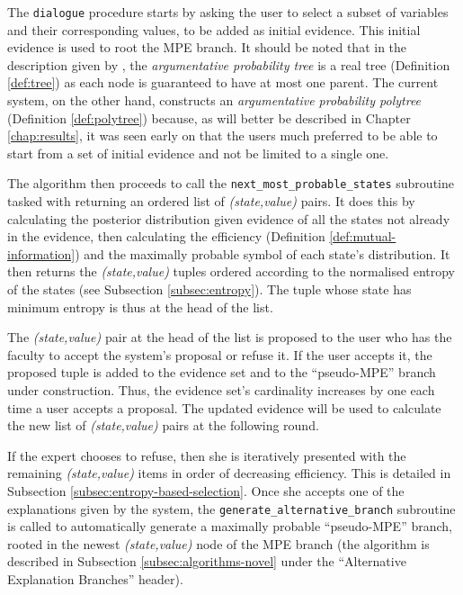 The \texttt{dialogue} procedure starts by asking the user to select a subset of variables and their corresponding values, to be added as initial evidence.
This initial evidence is used to root the MPE branch.
It should be noted that in the description given by \citet{Butz2018}, the \textit{argumentative probability tree} is a real tree (Definition \ref{def:tree}) as each node is guaranteed to have at most one parent.
The current system, on the other hand, constructs an \textit{argumentative probability polytree} (Definition \ref{def:polytree}) because, as will better be described in Chapter \ref{chap:results}, it was seen early on that the users much preferred to be able to start from a set of initial evidence and not be limited to a single one.

The algorithm then proceeds to call the \texttt{next\_most\_probable\_states} subroutine tasked with returning an ordered list of \textit{(state,value)} pairs.
It does this by calculating the posterior distribution given evidence of all the states not already in the evidence, then calculating the efficiency (Definition \ref{def:mutual-information}) and the maximally probable symbol of each state's distribution.
It then returns the \textit{(state,value)} tuples ordered according to the normalised entropy of the states (see Subsection \ref{subsec:entropy}).
The tuple whose state has minimum entropy is thus at the head of the list.

The \textit{(state,value)} pair at the head of the list is proposed to the user who has the faculty to accept the system's proposal or refuse it.
If the user accepts it, the proposed tuple is added to the evidence set and to the \enquote{pseudo-MPE} branch under construction.
Thus, the evidence set's cardinality increases by one each time a user accepts a proposal.
The updated evidence will be used to calculate the new list of \textit{(state,value)} pairs at the following round.

If the expert chooses to refuse, then she is iteratively presented with the remaining \textit{(state,value)} items in order of decreasing efficiency. 
This is detailed in Subsection \ref{subsec:entropy-based-selection}.
Once she accepts one of the explanations given by the system, the \texttt{generate\_alternative\_branch} subroutine is called to automatically generate a maximally probable \enquote{pseudo-MPE} branch, rooted in the newest \textit{(state,value)} node of the MPE branch (the algorithm is described in Subsection \ref{subsec:algorithms-novel} under the \enquote{Alternative Explanation Branches} header).

